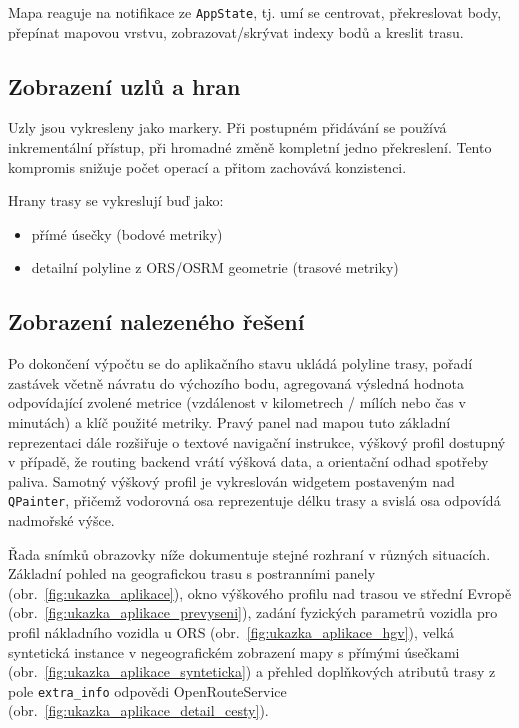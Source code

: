 Mapa reaguje na notifikace ze \texttt{AppState}, tj. umí se centrovat, překreslovat body, přepínat mapovou vrstvu, zobrazovat/skrývat indexy bodů a kreslit trasu.



\subsection{Zobrazení uzlů a hran}
Uzly jsou vykresleny jako markery. Při postupném přidávání se používá inkrementální přístup, při hromadné změně kompletní jedno překreslení. Tento kompromis snižuje počet operací a přitom zachovává konzistenci.

Hrany trasy se vykreslují buď jako:
\begin{itemize}
    \item přímé úsečky (bodové metriky)
    \item detailní polyline z ORS/OSRM geometrie (trasové metriky)
\end{itemize}

\subsection{Zobrazení nalezeného řešení} Po dokončení výpočtu se do aplikačního stavu ukládá polyline trasy, pořadí zastávek včetně návratu do výchozího bodu, agregovaná výsledná hodnota odpovídající zvolené metrice (vzdálenost v kilometrech / mílích nebo čas v minutách) a klíč použité metriky. Pravý panel nad mapou tuto základní reprezentaci dále rozšiřuje o textové navigační instrukce, výškový profil dostupný v případě, že routing backend vrátí výšková data, a orientační odhad spotřeby paliva. Samotný výškový profil je vykreslován widgetem postaveným nad \texttt{QPainter}, přičemž vodorovná osa reprezentuje délku trasy a svislá osa odpovídá nadmořské výšce.

Řada snímků obrazovky níže dokumentuje stejné rozhraní v různých situacích. Základní pohled na geografickou trasu s postranními panely (obr.~\ref{fig:ukazka_aplikace}), okno výškového profilu nad trasou ve střední Evropě (obr.~\ref{fig:ukazka_aplikace_prevyseni}), zadání fyzických parametrů vozidla pro profil nákladního vozidla u ORS (obr.~\ref{fig:ukazka_aplikace_hgv}), velká syntetická instance v negeografickém zobrazení mapy s přímými úsečkami (obr.~\ref{fig:ukazka_aplikace_synteticka}) a přehled doplňkových atributů trasy z pole \texttt{extra\_info} odpovědi OpenRouteService (obr.~\ref{fig:ukazka_aplikace_detail_cesty}).

